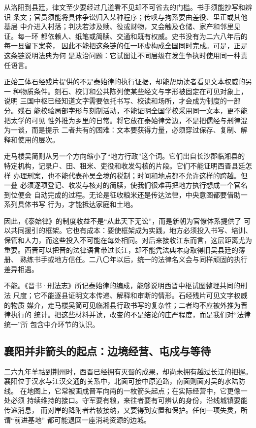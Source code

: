 从洛阳到县廷，律文至少要经过几道看不见却不可省去的门槛。书手须能抄写和辨识
条文；官员须能将具体争讼归入某种程序；传唤与拘系要由差役、里正或其他基层
中介进入村落；判决若涉及赎、役或财物，又会触及仓储、家产和邻里见证。每一环
都依赖人、纸笔或简牍、交通和既有权威。史书没有为二六八年后的每一县留下案卷，
因此不能把这条链的任一环虚构成全国同时完成。可是，正是这条链说明法典为何
是政治问题：它试图让不同层级在发生争执时使用同一种责任语言。

正始三体石经残片提供的不是泰始律的执行证据，却能帮助读者看见文本权威的另一
种物质条件。刻石、校订和公共陈列使某些经文与字形被固定在可见对象上，说明
三国中枢已经知道文字需要依托书写、校读和场所，才会成为制度的一部分。残石
能校验局部字形与刻制活动，不能证明全国学校采用同一文本，更不能把太学的可见
性外推为乡里的日常。将它放在泰始律旁边，不是把儒经与刑律混为一谈，而是提示
二者共有的困难：文本要获得力量，必须穿过保存、复制、解释和使用的层次。

走马楼吴简则从另一个方向缩小了“地方行政”这个词。它们出自长沙郡临湘县的
特定机构，记录户、田、租米、吏役和收发勾核的片段。它们不能证明西晋县廷怎样
办理刑案，也不能代表孙吴全境的税制；时间和地点都不允许这样的跨越。但一叠
必须逐项登记、收发与核对的简牍，使我们很难再把地方执行想成一个官名到位便会
自动完成的过程。无论是征收粮米还是传达法律，中央意图都要借助一系列具体书写
行为，才能抵达家庭和土地。

因此，《泰始律》的制度收益不是“从此天下无讼”，而是新朝为官僚体系提供了
可以共同援引的框架。它也有成本：要使框架成为实践，地方必须投入书写、培训、
保管和人力，而这些投入不可能在每处相同。对后来接收江东而言，这层距离尤为
重要。西晋可以把晋的法律语言带过长江，却不能凭法典本身取得旧吴县廷的簿册、
熟练书手或地方信任。二八〇年以后，统一的法律名义会与同样顽固的执行差异相遇。

\begin{debate}[法典的篇数能否证明它已经被全境执行？]
不能。《晋书·刑法志》所记泰始律的编成，能够说明西晋中枢试图整理共同的刑法
尺度；它不能逐县证明文本传递、解释和审断的情形。石经残片可见文字权威的物质
媒介，走马楼吴简可见临湘县行政书写的复杂性；二者均不应被外推为晋律执行的
统计。把这些材料并读，改变的不是结论的庄严程度，而是我们对“法律统一”所
包含中介环节的认识。
\end{debate}

\subsection{襄阳并非箭头的起点：边境经营、屯戍与等待}

二六九年羊祜到荆州时，西晋已经拥有灭蜀的成果，却尚未拥有越过长江的把握。
襄阳位于汉水与江汉交通的关系中，北面可接中原道路，南面则面对吴的水陆防线。
在地图上，它常被画成晋军向南的一枚箭头起点；在实际经营中，它更像一处必须
持续维持的接口。守军要有粮，来往者要有可辨认的身份，沿线城镇要能传递消息，
而对岸的降附者若被接纳，又要得到安置和保护。任何一项失灵，所谓“前进基地”
都可能退回一座消耗资源的边城。

